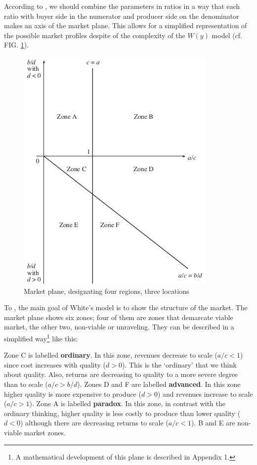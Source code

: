 \documentclass[a4paper, 12pt, openright, oneside, german, french, brazil, english, article]{abntex2}
\begin{document}
	
	According to , we should combine the parameters in ratios in a way that each ratio with buyer side in the numerator and producer side on the denominator makes an axis of the market plane. This allows for a simplified representation of the possible market profiles despite of the complexity of the $W(y)$ model (cf. FIG. \ref{market-plane}).
	
	
	\begin{figure}[th]
		\centering
		\caption{Market plane, designating four regions, three locations}
		\label{market-plane}
		\includegraphics[scale=1]{market_plane_favereau.png}
	\end{figure}

	To , the main goal of White's model is to show the structure of the market. The market plane shows six zones; four of them are zones that demarcate viable market, the other two, non-viable or unraveling. They can be described in a simplified way\footnote{A mathematical development of this plane is described in Appendix 1.} like this:
	
	Zone C is labelled \textbf{ordinary}. In this zone, revenues decrease to scale ($a/c < 1$) since cost increases with quality ($d > 0$). This is the `ordinary' that we think about quality. Also, returns are decreasing to quality to a more severe degree than to scale ($a/c > b/d$). Zones D and F are labelled \textbf{advanced}. In this zone higher quality is more expensive to produce ($d > 0$) and revenues increase to scale ($a/c > 1$). Zone A is labelled \textbf{paradox}. In this zone, in contrast with the ordinary thinking, higher quality is less costly to produce than lower quality ($d < 0$) although there are decreasing returns to scale ($a/c < 1$). B and E are non-viable market zones. 
	
\end{document}
